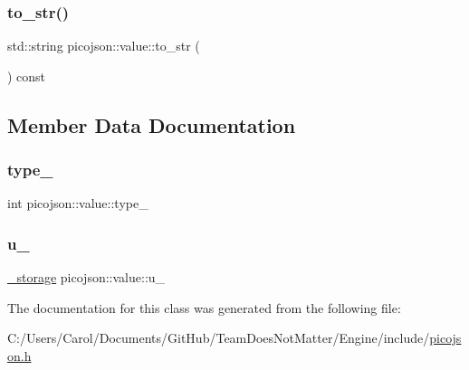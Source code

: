 \hypertarget{classpicojson_1_1value_a005099b2865752cf31b7ced33bd85f59}{}\label{classpicojson_1_1value_a005099b2865752cf31b7ced33bd85f59} 
\subsubsection{\texorpdfstring{to\+\_\+str()}{to\_str()}}
{\footnotesize\ttfamily std\+::string picojson\+::value\+::to\+\_\+str (\begin{DoxyParamCaption}{ }\end{DoxyParamCaption}) const\hspace{0.3cm}{\ttfamily [inline]}}



\subsection{Member Data Documentation}
\hypertarget{classpicojson_1_1value_af77ae4525a20f6fce6ea9ff1c4709312}{}\label{classpicojson_1_1value_af77ae4525a20f6fce6ea9ff1c4709312} 
\subsubsection{\texorpdfstring{type\+\_\+}{type\_}}
{\footnotesize\ttfamily int picojson\+::value\+::type\+\_\+\hspace{0.3cm}{\ttfamily [protected]}}

\hypertarget{classpicojson_1_1value_aa7948fe10fcbc19ab9c8dee5e5099f77}{}\label{classpicojson_1_1value_aa7948fe10fcbc19ab9c8dee5e5099f77} 
\subsubsection{\texorpdfstring{u\+\_\+}{u\_}}
{\footnotesize\ttfamily \hyperlink{unionpicojson_1_1value_1_1__storage}{\+\_\+storage} picojson\+::value\+::u\+\_\+\hspace{0.3cm}{\ttfamily [protected]}}



The documentation for this class was generated from the following file\+:\begin{DoxyCompactItemize}
\item 
C\+:/\+Users/\+Carol/\+Documents/\+Git\+Hub/\+Team\+Does\+Not\+Matter/\+Engine/include/\hyperlink{picojson_8h}{picojson.\+h}\end{DoxyCompactItemize}
